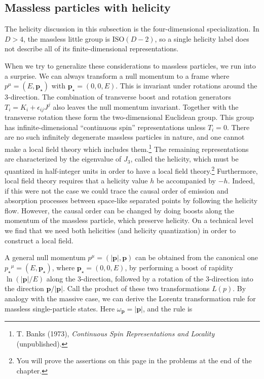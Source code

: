 \subsection{Massless particles with helicity}

The helicity discussion in this subsection is the four-dimensional specialization. In
$D>4$, the massless little group is $\mathrm{ISO}(D-2)$, so a single helicity label does
not describe all of its finite-dimensional representations.

When we try to generalize these considerations to massless particles, we run into a
surprise. We can always transform a null momentum to a frame where
$p^\mu=(E,\mathbf p_\star)$ with $\mathbf p_\star=(0,0,E)$.
This is invariant under rotations around the 3-direction. The combination of transverse
boost and rotation generators $T_i=K_i+\epsilon_{ij}J^j$ also leaves the null momentum invariant.
Together with the transverse rotation these form the two-dimensional Euclidean group.
This group has infinite-dimensional ``continuous spin'' representations unless $T_i=0$.
There are no such infinitely degenerate massless particles in nature, and one cannot
make a local field theory which includes them.\footnote[1]{T. Banks (1973), \emph{Continuous Spin Representations and Locality} (unpublished).}
The remaining representations are characterized by the eigenvalue of $J_3$, called the helicity, which must be quantized in
half-integer units in order to have a local field theory.\footnote[2]{You will prove the assertions on this page in the problems at the end of the chapter.}
Furthermore, local field theory requires that a helicity value $h$ be accompanied by $-h$. Indeed, if this were not the
case we could trace the causal order of emission and absorption processes between
space-like separated points by following the helicity flow. However, the causal order
can be changed by doing boosts along the momentum of the massless particle, which
preserve helicity. On a technical level we find that we need both helicities (and helicity
quantization) in order to construct a local field.

A general null momentum $p^\mu=(|\mathbf p|,\mathbf p)$ can be obtained from the canonical one
$p_\star{}^\mu=(E,\mathbf p_\star)$, where $\mathbf p_\star=(0,0,E)$, by performing a boost
of rapidity $\ln(|\mathbf p|/E)$ along the 3-direction, followed by a rotation
of the 3-direction into the direction $\mathbf p/|\mathbf p|$. Call the product of these two transformations
$L(p)$. By analogy with the massive case, we can derive the Lorentz transformation rule
for massless single-particle states. Here $\omega_{\mathbf p}=|\mathbf p|$, and the rule is

